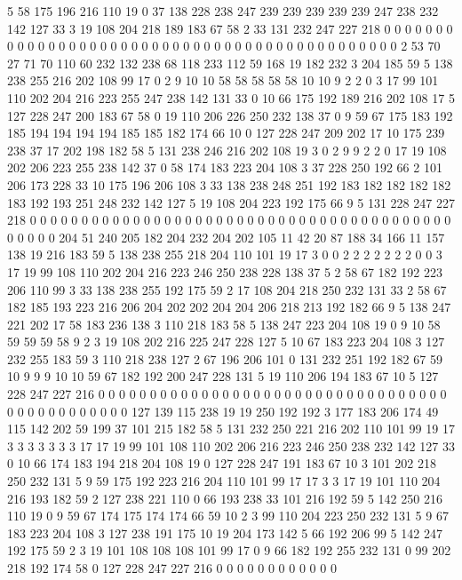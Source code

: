 5 58 175 196 216 110 19 0 37 138 228 238 247 239 239 239 239 239 247 238
232 142 127 33 3 19 108 204 218 189 183 67 58 2 33 131 232 247 227 218
0 0 0 0 0 0 0 0 0 0 0 0 0 0 0 0 0 0 0 0
0 0 0 0 0 0 0 0 0 0 0 0 0 0 0 0 0 0 0 0
0 0 0 0 0 2 53 70 27 71 70 110 60 232 132 238 68 118 233 112
59 168 19 182 232 3 204 185 59 5 138 238 255 216 202 108 99 17 0 2
9 10 10 58 58 58 58 58 10 10 9 2 2 0 3 17 99 101 110 202
204 216 223 255 247 238 142 131 33 0 10 66 175 192 189 216 202 108 17 5
127 228 247 200 183 67 58 0 19 110 206 226 250 232 138 37 0 9 59 67
175 183 192 185 194 194 194 194 185 185 182 174 66 10 0 127 228 247 209 202
17 10 175 239 238 37 17 202 198 182 58 5 131 238 246 216 202 108 19 3
0 2 9 9 2 2 0 17 19 108 202 206 223 255 238 142 37 0 58 174
183 223 204 108 3 37 228 250 192 66 2 101 206 173 228 33 10 175 196 206
108 3 33 138 238 248 251 192 183 182 182 182 182 183 192 193 251 248 232 142
127 5 19 108 204 223 192 175 66 9 5 131 228 247 227 218 0 0 0 0
0 0 0 0 0 0 0 0 0 0 0 0 0 0 0 0 0 0 0 0
0 0 0 0 0 0 0 0 0 0 0 0 0 0 0 0 0 0 0 0
0 0 204 51 240 205 182 204 232 204 202 105 11 42 20 87 188 34 166 11
157 138 19 216 183 59 5 138 238 255 218 204 110 101 19 17 3 0 0 2
2 2 2 2 2 2 0 0 3 17 19 99 108 110 202 204 216 223 246 250
238 228 138 37 5 2 58 67 182 192 223 206 110 99 3 33 138 238 255 192
175 59 2 17 108 204 218 250 232 131 33 2 58 67 182 185 193 223 216 206
204 202 202 204 204 206 218 213 192 182 66 9 5 138 247 221 202 17 58 183
236 138 3 110 218 183 58 5 138 247 223 204 108 19 0 9 10 58 59 59
59 58 9 2 3 19 108 202 216 225 247 228 127 5 10 67 183 223 204 108
3 127 232 255 183 59 3 110 218 238 127 2 67 196 206 101 0 131 232 251
192 182 67 59 10 9 9 9 10 10 59 67 182 192 200 247 228 131 5 19
110 206 194 183 67 10 5 127 228 247 227 216 0 0 0 0 0 0 0 0
0 0 0 0 0 0 0 0 0 0 0 0 0 0 0 0 0 0 0 0
0 0 0 0 0 0 0 0 0 0 0 0 0 0 0 0 0 0 127 139
115 238 19 19 250 192 192 3 177 183 206 174 49 115 142 202 59 199 37 101
215 182 58 5 131 232 250 221 216 202 110 101 99 19 17 3 3 3 3 3
3 3 17 17 19 99 101 108 110 202 206 216 223 246 250 238 232 142 127 33
0 10 66 174 183 194 218 204 108 19 0 127 228 247 191 183 67 10 3 101
202 218 250 232 131 5 9 59 175 192 223 216 204 110 101 99 17 17 3 3
17 19 101 110 204 216 193 182 59 2 127 238 221 110 0 66 193 238 33 101
216 192 59 5 142 250 216 110 19 0 9 59 67 174 175 174 174 66 59 10
2 3 99 110 204 223 250 232 131 5 9 67 183 223 204 108 3 127 238 191
175 10 19 204 173 142 5 66 192 206 99 5 142 247 192 175 59 2 3 19
101 108 108 108 101 99 17 0 9 66 182 192 255 232 131 0 99 202 218 192
174 58 0 127 228 247 227 216 0 0 0 0 0 0 0 0 0 0 0 0

